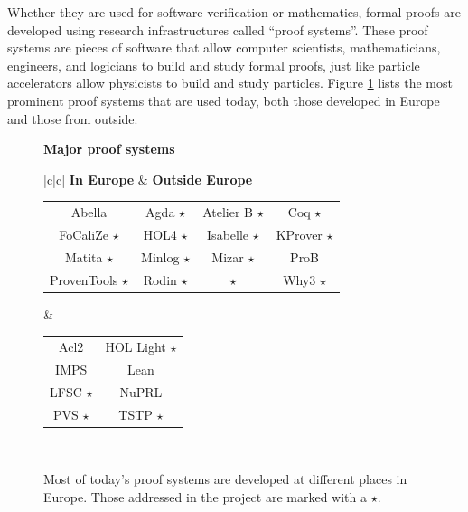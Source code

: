 Whether they are used for software verification or mathematics, formal
proofs are developed using research infrastructures called
``proof systems''.  These proof systems are pieces of software that
allow computer scientists, mathematicians, engineers, and logicians to
build and study formal proofs, just like particle accelerators allow
physicists to build and study particles. Figure \ref{systems} lists
the most prominent proof systems that are used today, both those
developed in Europe and those from outside.

\newcommand\s{ $\star$}
\begin{figure}[ht]
  \begin{shaded}
    \begin{center}
      {\bf \Large Major proof systems}\\[5mm]
      \begin{tabular}{|c|c|}\hline
       {\bf In Europe} & {\bf Outside Europe}\\\hline
        \begin{minipage}{10cm}
          \begin{tabular}{cccc}
            Abella & Agda\s & Atelier B\s & Coq\s\\
            FoCaliZe\s & HOL4\s & Isabelle\s & KProver\s\\
            Matita\s & Minlog\s & Mizar\s & ProB\\
            ProvenTools\s & Rodin\s & \tlaplus\s & Why3\s\\
          \end{tabular}
        \end{minipage}
        &\begin{minipage}{4cm}
           \begin{tabular}{cc}
             Acl2 & HOL Light\s\\
             IMPS & Lean\\
             LFSC\s & NuPRL\\
             PVS\s & TSTP\s
           \end{tabular}
         \end{minipage}\\\hline
      \end{tabular}
    \end{center}
    \vspace{-5mm}
    \caption{Most of today's proof systems are developed at different
      places in Europe. Those addressed in the project are marked with
      a $\star$.\label{systems}}
  \end{shaded}
\end{figure}

